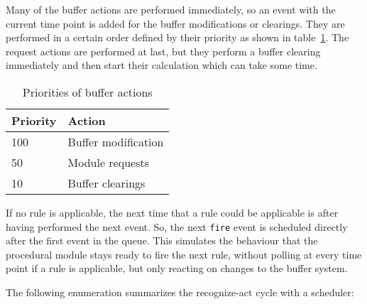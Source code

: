 Many of the buffer actions are performed immediately, so an event with the current time point is added for the buffer modifications or clearings. They are performed in a certain order defined by their priority as shown in table~\ref{tab:action_priorities}. The request actions are performed at last, but they perform a buffer clearing immediately and then start their calculation which can take some time. 

\begin{table}[htb]
\begin{center}
\caption{Priorities of buffer actions}
\label{tab:action_priorities}
\begin{tabular}{|l|l|}
\hline
Priority & Action\\
\hline
100 & Buffer modification\\
50 & Module requests\\
10 & Buffer clearings\\
\hline
\end{tabular}
\end{center}
\end{table}


If no rule is applicable, the next time that a rule could be applicable is after having performed the next event. So, the next \lstinline|fire| event is scheduled directly after the first event in the queue. This simulates the behaviour that the procedural module stays ready to fire the next rule, without polling at every time point if a rule is applicable, but only reacting on changes to the buffer system. 

The following enumeration summarizes the recognize-act cycle with a scheduler:

